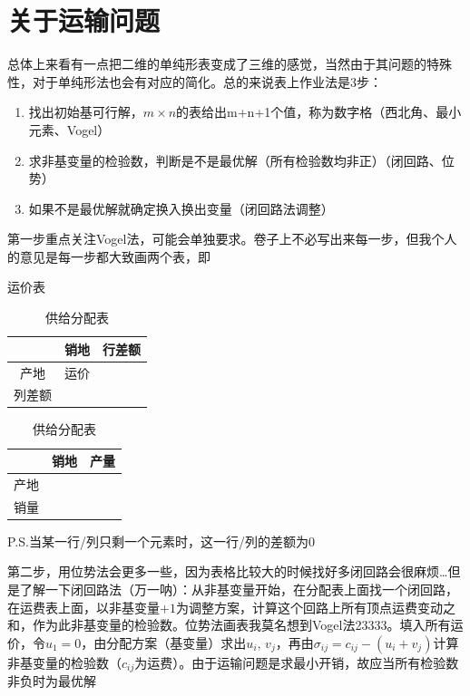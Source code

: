 \documentclass[]{report}
\begin{document}
	\section{关于运输问题}
		总体上来看有一点把二维的单纯形表变成了三维的感觉，当然由于其问题的特殊性，对于单纯形法也会有对应的简化。总的来说表上作业法是3步：\par
		\begin{enumerate}
			\item 找出初始基可行解，$m\times n$的表给出m+n+1个值，称为数字格（西北角、最小元素、Vogel）
			\item 求非基变量的检验数，判断是不是最优解（所有检验数均非正）（闭回路、位势）
			\item 如果不是最优解就确定换入换出变量（闭回路法调整）
		\end{enumerate}\par
		第一步重点关注Vogel法，可能会单独要求。卷子上不必写出来每一步，但我个人的意见是每一步都大致画两个表，即
		\begin{table}[h]
			\centering
			\begin{minipage}{15em}
				\centering
				\caption{运价表}
				\begin{tabular}{ccc}
					\toprule
					&销地&行差额\\
					\midrule
					产地&运价&\\
					列差额&&\\
					\bottomrule
				\end{tabular}
			\end{minipage}
			\qquad\qquad
			\begin{minipage}{15em}
				\centering
				\caption{供给分配表}
				\begin{tabular}{ccc}
					\toprule
					&销地&产量\\
					\midrule
					产地&&\\
					销量&&\\
					\bottomrule
				\end{tabular}
			\end{minipage}
		\end{table}\par
		P.S.当某一行/列只剩一个元素时，这一行/列的差额为0\par
		第二步，用位势法会更多一些，因为表格比较大的时候找好多闭回路会很麻烦\dots 但是了解一下闭回路法（万一呐）：从非基变量开始，在分配表上面找一个闭回路，在运费表上面，以非基变量$+1$为调整方案，计算这个回路上所有顶点运费变动之和，作为此非基变量的检验数。位势法画表我莫名想到Vogel法23333。填入所有运价，令$u_1=0$，由分配方案（基变量）求出$u_i,\,v_j$，再由$\sigma_{ij}=c_{ij}-(u_i+v_j)$计算非基变量的检验数（$c_{ij}$为运费）。由于运输问题是求最小开销，故应当所有检验数非负时为最优解\par
\end{document}
